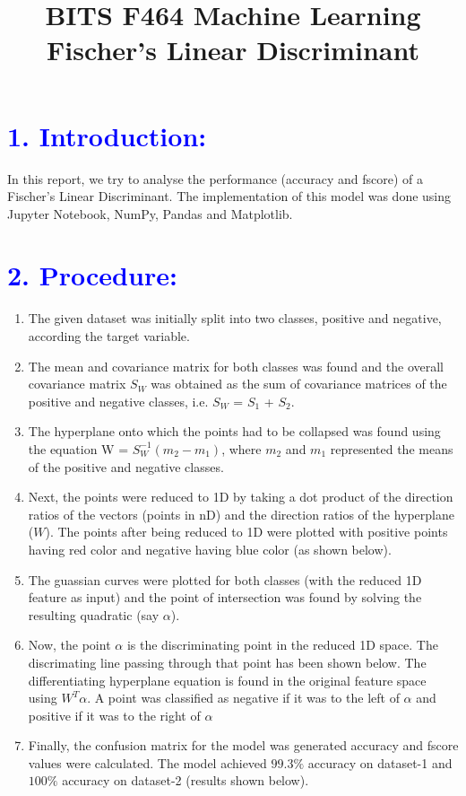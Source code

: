 \documentclass[a4paper,10pt,twoside]{article}
\title
{
\LARGE BITS F464 Machine Learning \\
\LARGE Fischer's Linear Discriminant
}
\date{}
\author{}
\begin{document}
\maketitle
\section*{\textcolor{blue}{1. Introduction:}}
In this report, we try to analyse the performance (accuracy and fscore) of a Fischer's Linear Discriminant. The implementation of this model was done using Jupyter Notebook, NumPy, Pandas and Matplotlib.

\section*{\textcolor{blue}{2. Procedure:}}
\begin{enumerate}
\item{The given dataset was initially split into two classes, positive and negative, according the target variable.}
\item{The mean and covariance matrix for both classes was found and the overall covariance matrix $S_W$ was obtained as the sum of covariance matrices of the positive and negative classes, i.e. $S_W$ = $S_1$ + $S_2$.}
\item{The hyperplane onto which the points had to be collapsed was found using the equation W = $S_W^{-1}(m_2 - m_1)$, where $m_2$ and $m_1$ represented the means of the positive and negative classes.}
\item{Next, the points were reduced to 1D by taking a dot product of the direction ratios of the vectors (points in nD) and the direction ratios of the hyperplane ($W$). The points after being reduced to 1D were plotted with positive points having red color and negative having blue color (as shown below).}
\item{The guassian curves were plotted for both classes (with the reduced 1D feature as input) and the point of intersection was found by solving the resulting quadratic (say $\alpha$).}
\item{Now, the point $\alpha$ is the discriminating point in the reduced 1D space. The discrimating line passing through that point has been shown below. The differentiating hyperplane equation is found in the original feature space using $W^T\alpha$. A point was classified as negative if it was to the left of $\alpha$ and positive if it was to the right of $\alpha$}
\item{Finally, the confusion matrix for the model was generated accuracy and fscore values were calculated. The model achieved $99.3\%$ accuracy on dataset-1 and $100\%$ accuracy on dataset-2 (results shown below).}
\end{enumerate}
\end{document}
